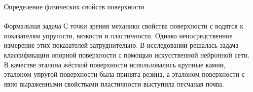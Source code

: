 \documentclass[aspectratio=169,xcolor=table,10pt]{beamer}
\begin{document}
\begin{frame}[t]{Определение физических свойств поверхности}
    \framesubtitle{}
    \vspace{-0.3cm}
    {\large\begin{block}{Формальная задача}
            С точки зрения механики свойства поверхности с водятся к показателям упругости, вязкости и пластичности. Однако непосредственное измерение этих показателей затруднительно. В исследовании решалась задача классификации опорной поверхности с помощью искусственной нейронной сети. В качестве эталона жёсткой поверхности использовались крупные камни, эталоном упругой поверхности была принята резина, а эталоном поверхности с явно выраженными свойствами пластичности выступила песчаная почва. 
        \end{block}}




\end{frame}
\end{document}
